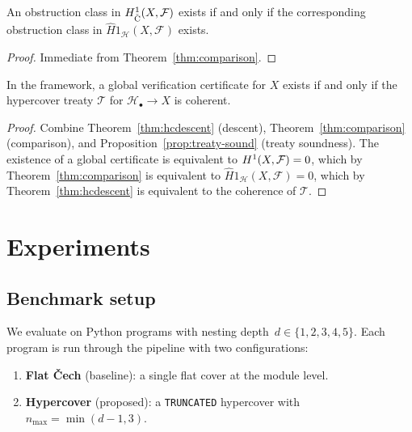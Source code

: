 \documentclass[11pt]{article}
\newcommand{\HC}{\mathcal{H}}              %
\newcommand{\Treaty}{\mathcal{T}}          %
\newcommand{\HCech}{\hat{H}}              %
\newcommand{\KindTrunc}{\texttt{TRUNCATED}}
\begin{document}
\begin{corollary}\label{cor:obstr}
  An obstruction class in $H^{1}_{\mathrm{\check{C}}}(X, \mathcal{F})$
  exists if and only if the corresponding obstruction class in
  $\HCech{1}_{\HC}(X, \mathcal{F})$ exists.
\end{corollary}

\begin{proof}
  Immediate from Theorem~\ref{thm:comparison}.
\end{proof}

\begin{corollary}\label{cor:detect}
  In the \JuGeo{} framework, a global verification certificate for $X$
  exists if and only if the hypercover treaty $\Treaty$ for
  $\HC_\bullet \to X$ is coherent.
\end{corollary}

\begin{proof}
  Combine Theorem~\ref{thm:hcdescent} (descent), Theorem~\ref{thm:comparison}
  (comparison), and Proposition~\ref{prop:treaty-sound} (treaty soundness).
  The existence of a global certificate is equivalent to
  $H^{1}(X, \mathcal{F}) = 0$, which by Theorem~\ref{thm:comparison}
  is equivalent to $\HCech{1}_{\HC}(X, \mathcal{F}) = 0$, which by
  Theorem~\ref{thm:hcdescent} is equivalent to the coherence of $\Treaty$.
\end{proof}

\section{Experiments}\label{sec:experiments}

\subsection{Benchmark setup}

We evaluate on \ppFortyThreeTotalPrograms{} Python programs with
nesting depth~$d \in \{1, 2, 3, 4, 5\}$.  Each program is run through the \JuGeo{} pipeline with
two configurations:
\begin{enumerate}
  \item \textbf{Flat Čech} (baseline): a single flat cover at the module
    level.
  \item \textbf{Hypercover} (proposed): a \KindTrunc{} hypercover with
    $n_{\max} = \min(d{-}1, 3)$.
\end{enumerate}
\end{document}
